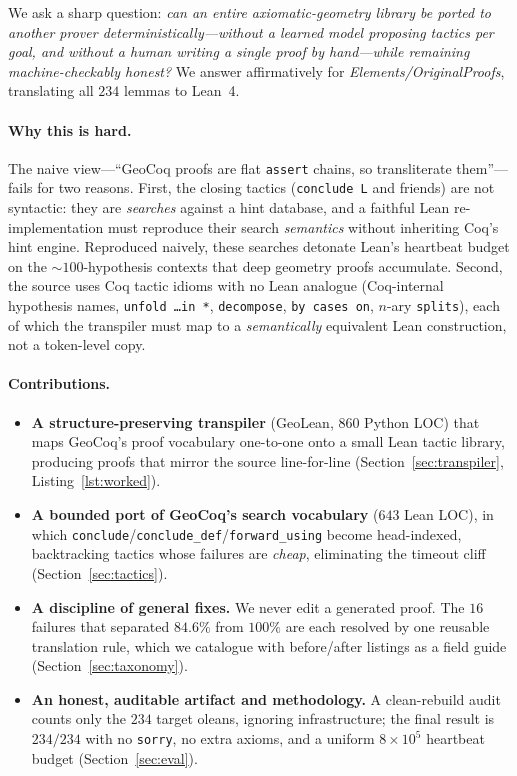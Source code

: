 \documentclass{article}
\begin{document}
We ask a sharp question: \emph{can an entire axiomatic-geometry library be ported to another
prover deterministically---without a learned model proposing tactics per goal, and without a
human writing a single proof by hand---while remaining machine-checkably honest?} We answer
affirmatively for \emph{Elements/OriginalProofs}, translating all $234$ lemmas to Lean~4.

\paragraph{Why this is hard.}
The naive view---``GeoCoq proofs are flat \texttt{assert} chains, so transliterate them''---
fails for two reasons. First, the closing tactics (\texttt{conclude L} and friends) are not
syntactic: they are \emph{searches} against a hint database, and a faithful Lean re-implementation
must reproduce their search \emph{semantics} without inheriting Coq's hint engine. Reproduced
naively, these searches detonate Lean's heartbeat budget on the ${\sim}100$-hypothesis contexts
that deep geometry proofs accumulate. Second, the source uses Coq tactic idioms with no Lean
analogue (Coq-internal hypothesis names, \texttt{unfold \ldots in *}, \texttt{decompose},
\texttt{by cases on}, $n$-ary \texttt{splits}), each of which the transpiler must map to a
\emph{semantically} equivalent Lean construction, not a token-level copy.

\paragraph{Contributions.}
\begin{itemize}
  \item \textbf{A structure-preserving transpiler} (GeoLean, $860$ Python LOC) that maps GeoCoq's
    proof vocabulary one-to-one onto a small Lean tactic library, producing proofs that mirror
    the source line-for-line (Section~\ref{sec:transpiler}, Listing~\ref{lst:worked}).
  \item \textbf{A bounded port of GeoCoq's search vocabulary} ($643$ Lean LOC), in which
    \texttt{conclude}/\texttt{conclude\_def}/\texttt{forward\_using} become head-indexed,
    backtracking tactics whose failures are \emph{cheap}, eliminating the timeout cliff
    (Section~\ref{sec:tactics}).
  \item \textbf{A discipline of general fixes.} We never edit a generated proof. The $16$ failures
    that separated $84.6\%$ from $100\%$ are each resolved by one reusable translation rule, which
    we catalogue with before/after listings as a field guide (Section~\ref{sec:taxonomy}).
  \item \textbf{An honest, auditable artifact and methodology.} A clean-rebuild audit counts only
    the $234$ target oleans, ignoring infrastructure; the final result is $234/234$ with no
    \texttt{sorry}, no extra axioms, and a uniform $8{\times}10^5$ heartbeat budget
    (Section~\ref{sec:eval}).
\end{itemize}
\end{document}
